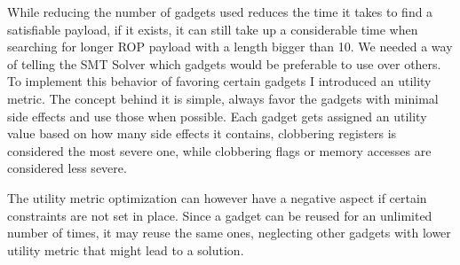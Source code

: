 While reducing the number of gadgets used reduces the time it takes to find a satisfiable payload, if it exists, it can still take up a considerable time when searching for longer ROP payload with a length bigger than 10. We needed a way of telling the SMT Solver which gadgets would be preferable to use over others. To implement this behavior of favoring certain gadgets I introduced an utility metric. The concept behind it is simple, always favor the gadgets with minimal side effects and use those when possible. Each gadget gets assigned an utility value based on how many side effects it contains, clobbering registers is considered the most severe one, while clobbering flags or memory accesses are considered less severe.


The utility metric optimization can however have a negative aspect if certain constraints are not set in place. Since a gadget can be reused for an unlimited number of times, it may reuse the same ones, neglecting other gadgets with lower utility metric that might lead to a solution.